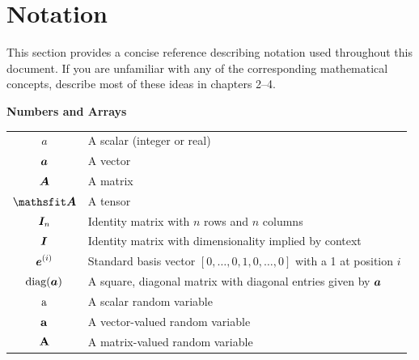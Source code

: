 \chapter*{Notation}
\label{notation}



This section provides a concise reference describing notation used throughout this
document.
If you are unfamiliar with any of the corresponding mathematical concepts,
\citet{dlbook} describe most of these ideas in
chapters 2--4.

\vspace{\notationgap}
\noindent\begin{minipage}{\textwidth}
\centerline{\bf Numbers and Arrays}
\bgroup
\def\arraystretch{1.5}
\begin{tabular}{cp{3.25in}}
$\displaystyle a$ & A scalar (integer or real)\\
$\displaystyle {\bm{a}}$ & A vector\\
$\displaystyle {\bm{A}}$ & A matrix\\
$\displaystyle \tA$ & A tensor\\
$\displaystyle {\bm{I}}_n$ & Identity matrix with $n$ rows and $n$ columns\\
$\displaystyle {\bm{I}}$ & Identity matrix with dimensionality implied by context\\
$\displaystyle {\bm{e}}^{(i)}$ & Standard basis vector $[0,\dots,0,1,0,\dots,0]$ with a 1 at position $i$\\
$\displaystyle \text{diag}({\bm{a}})$ & A square, diagonal matrix with diagonal entries given by ${\bm{a}}$\\
$\displaystyle {\textnormal{a}}$ & A scalar random variable\\
$\displaystyle {\mathbf{a}}$ & A vector-valued random variable\\
$\displaystyle {\mathbf{A}}$ & A matrix-valued random variable\\
\end{tabular}
\egroup
{}
\end{minipage}

